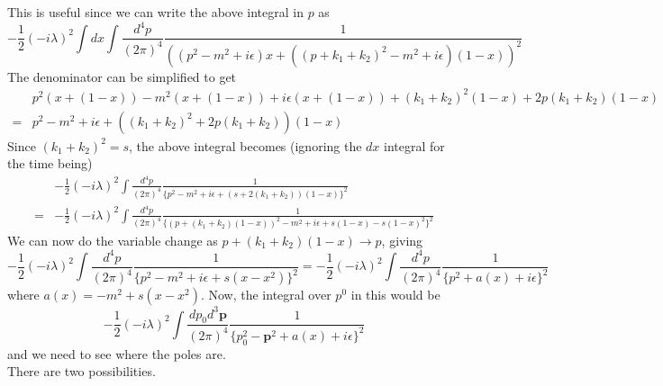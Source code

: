 \documentclass[11pt]{article}
\numberwithin{equation}{section}
\begin{document}
This is useful since we can write the above integral in \(p\) as 
\begin{equation*}
    -\frac{1}{2}(-i\lambda)^2 \int dx  \int \frac{d^4p}{(2\pi)^4} \frac{1}{\left((p^2 - m^2 + i\epsilon)x + \left((p+k_1+k_2)^2 - m^2 +i\epsilon \right)(1-x)\right)^2}
\end{equation*}
The denominator can be simplified to get 
\begin{align*}
    &p^2(x + (1-x)) - m^2(x + (1-x)) + i\epsilon(x + (1-x)) + (k_1 + k_2)^2(1-x) + 2p(k_1+k_2)(1-x)\\
    =& p^2 - m^2 + i\epsilon +((k_1+k_2)^2 + 2p(k_1+k_2))(1-x)
\end{align*}
Since \((k_1 + k_2)^2 = s\), the above integral becomes (ignoring the \(dx\) integral for the time being)
\begin{align*}
    &-\frac{1}{2}(-i\lambda)^2  \int \frac{d^4p}{(2\pi)^4} \frac{1}{\{p^2 - m^2 + i\epsilon +(s + 2(k_1+k_2))(1-x)\}^2} \\
    = & -\frac{1}{2}(-i\lambda)^2  \int \frac{d^4p}{(2\pi)^4} \frac{1}{\{(p + (k_1 + k_2)(1-x))^2 - m^2 + i\epsilon + s(1-x) - s(1-x)^2\}^2}
\end{align*}
We can now do the variable change as \(p + (k_1 + k_2)(1-x) \to p\), giving 
\begin{equation*}
    -\frac{1}{2}(-i\lambda)^2  \int \frac{d^4p}{(2\pi)^4} \frac{1}{\{p^2 - m^2 + i\epsilon + s(x-x^2)\}^2} = -\frac{1}{2}(-i\lambda)^2  \int \frac{d^4p}{(2\pi)^4} \frac{1}{\{p^2 + a(x) + i\epsilon\}^2}
\end{equation*}
where \(a(x) = -m^2 + s(x- x^2)\). Now, the integral over \(p^0\) in this would be 
\begin{equation*}
    -\frac{1}{2}(-i\lambda)^2  \int \frac{dp_0 d^3\textbf{p}}{(2\pi)^4} \frac{1}{\{p_0^2 - \textbf{p}^2 + a(x) + i\epsilon\}^2}
\end{equation*}
and we need to see where the poles are. \\
There are two possibilities. 
\end{document}
